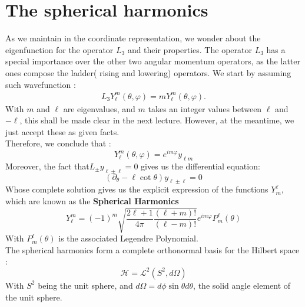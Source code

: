 \section{The spherical harmonics }
As we maintain in the coordinate representation, we wonder about the eigenfunction for the operator $L_3$ and their properties. The operator $L_3$ has a special importance over the other two angular momentum operators, as the latter ones compose the ladder( rising and lowering) operators. We start by assuming such wavefunction :
\begin{eqnarray}
L_3 Y^{m} _ {\ell} ( \theta, \varphi) = m Y^{m}_{\ell} ( \theta, \varphi).
\end{eqnarray}
With $ m$ and $ \ell$ are eigenvalues, and $m$ takes an integer values between $ \ell$ and $ -\ell$, this shall be made clear in the next lecture. However, at the meantime, we just accept these as given facts.\\
Therefore, we conclude that :
\begin{equation}
Y^{m}_ {\ell} ( \theta, \varphi) = e^
{im\varphi} y _ { \ell m}
\end{equation}
Moreover,  the fact that$ L_\pm  y _ { \ell \pm \ell} =0$  gives us the differential equation:
\begin{equation}
\left( \partial_\theta - \ell \cot \theta \right) y _ { \ell \pm \ell} =0 
\end{equation}
Whose complete solution gives us the explicit expression of the functions $Y_{m} ^ {\ell}$, which are known as the \textbf{Spherical Harmonics }
\begin{equation}
Y^{m}_ {\ell} = (-1)^m \sqrt{\frac{2\ell+1}{4 \pi} \frac{(\ell+m)!}{(\ell-m)!}}e ^{im \varphi} P ^\ell _m (\theta)
\end{equation}
With $P ^\ell _m (\theta)$ is the associated Legendre Polynomial.\\
The spherical harmonics form a complete orthonormal basis for the Hilbert space :
\[
\mathcal{H} = \mathcal{L}^2 ( S^2, d\Omega)
\]
With $S^2$ being the unit sphere, and $ d\Omega = d \phi \sin\theta d\theta $, the solid angle element of the unit sphere. 
